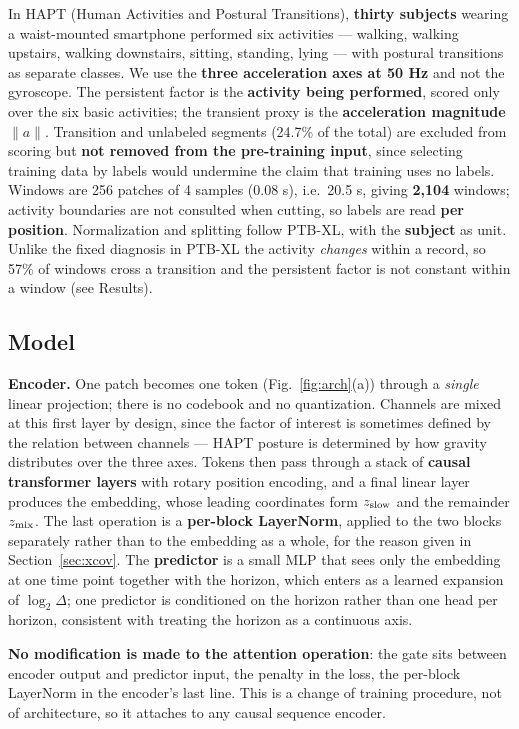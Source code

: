 In HAPT (Human Activities and Postural Transitions), \textbf{thirty subjects} wearing a waist-mounted smartphone performed six activities --- walking, walking upstairs, walking downstairs, sitting, standing, lying --- with postural transitions as separate classes. We use the \textbf{three acceleration axes at 50 Hz} and not the gyroscope. The persistent factor is the \textbf{activity being performed}, scored only over the six basic activities; the transient proxy is the \textbf{acceleration magnitude} $\lVert a\rVert$. Transition and unlabeled segments (24.7\% of the total) are excluded from scoring but \textbf{not removed from the pre-training input}, since selecting training data by labels would undermine the claim that training uses no labels. Windows are 256 patches of 4 samples (0.08 s), i.e.\ 20.5 s, giving \textbf{2,104} windows; activity boundaries are not consulted when cutting, so labels are read \textbf{per position}. Normalization and splitting follow PTB-XL, with the \textbf{subject} as unit. Unlike the fixed diagnosis in PTB-XL the activity \emph{changes} within a record, so 57\% of windows cross a transition and the persistent factor is not constant within a window (see Results).

\subsection{Model}

\textbf{Encoder.} One patch becomes one token (Fig.~\ref{fig:arch}(a)) through a \emph{single} linear projection; there is no codebook and no quantization. Channels are mixed at this first layer by design, since the factor of interest is sometimes defined by the relation between channels --- HAPT posture is determined by how gravity distributes over the three axes. Tokens then pass through a stack of \textbf{causal transformer layers} with rotary position encoding, and a final linear layer produces the embedding, whose leading coordinates form $z_{\mathrm{slow}}$ and the remainder $z_{\mathrm{mix}}$. The last operation is a \textbf{per-block LayerNorm}, applied to the two blocks separately rather than to the embedding as a whole, for the reason given in Section~\ref{sec:xcov}. The \textbf{predictor} is a small MLP that sees only the embedding at one time point together with the horizon, which enters as a learned expansion of $\log_2\Delta$; one predictor is conditioned on the horizon rather than one head per horizon, consistent with treating the horizon as a continuous axis.

\textbf{No modification is made to the attention operation}: the gate sits between encoder output and predictor input, the penalty in the loss, the per-block LayerNorm in the encoder's last line. This is a change of training procedure, not of architecture, so it attaches to any causal sequence encoder.

